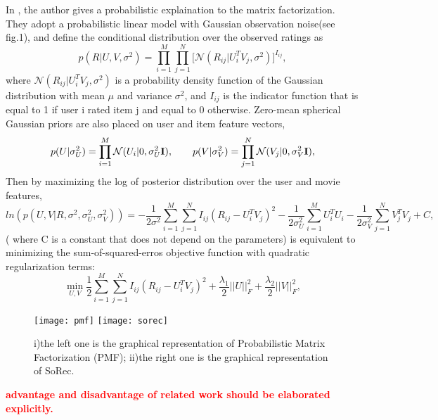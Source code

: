 In \cite{mnih2007probabilistic}, the author gives a probabilistic explaination to the matrix factorization. They adopt a probabilistic linear model with Gaussian observation noise(see fig.1), and define the conditional distribution over the observed ratings as
\begin{equation}
p(R|U,V,\sigma^2) = \prod_{i=1}^{M}\prod_{j=1}^{N}\big[\mathcal{N}(R_{ij}|U_i^TV_j,\sigma^2)\big]^{I_{ij}},
\end{equation} 
where $\mathcal{N}(R_{ij}|U_i^TV_j,\sigma^2)$ is a probability density function of the Gaussian distribution with mean $\mu$ and variance $\sigma^2$, and $I_{ij}$ is the indicator function that is equal to 1 if user i rated item j and equal to 0 otherwise. Zero-mean spherical Gaussian priors are also placed on user and item feature vectors, 
\begin{equation}
p(U|\sigma_U^2) = \prod_{i=1}^{M}\mathcal{N}(U_{i}|0,\sigma_U^2\bold{I}),\quad\quad
p(V|\sigma_V^2) = \prod_{j=1}^{N}\mathcal{N}(V_{j}|0,\sigma_V^2\bold{I}),
\end{equation} 
Then by maximizing the log of posterior distribution over the user and movie features,
\begin{equation}
ln(p(U,V|R, \sigma^2,\sigma_U^2,\sigma_V^2)) = -\frac{1}{2\sigma^2}\sum_{i=1}^{M}\sum_{j=1}^{N}I_{ij}(R_{ij} - U_i^TV_j)^2 - \frac{1}{2\sigma_U^2}\sum_{i=1}^{M}U_i^TU_i - \frac{1}{2\sigma_V^2}\sum_{j=1}^{N}V_j^TV_j + C,
\end{equation} 
( where C is a constant that does not depend on the parameters) is equivalent to minimizing the sum-of-squared-erros objective function with quadratic regularization terms:
\begin{equation}
\min_{U,V}\frac{1}{2}\sum_{i=1}^{M}\sum_{j=1}^{N}I_{ij}(R_{ij} - U_i^TV_j)^2 + \frac{\lambda_1}{2}||U||_F^2 + \frac{\lambda_2}{2}||V||_F^2,
\end{equation} 
\begin{figure}[h]
	\caption{i)the left one is the graphical representation of Probabilistic Matrix Factorization (PMF); ii)the right one is the graphical representation of SoRec.}
	\centering
	\texttt{[image: pmf]}
	\texttt{[image: sorec]}
\end{figure}

\textcolor{red}{\textbf{advantage and disadvantage of related work should be elaborated explicitly.}}

